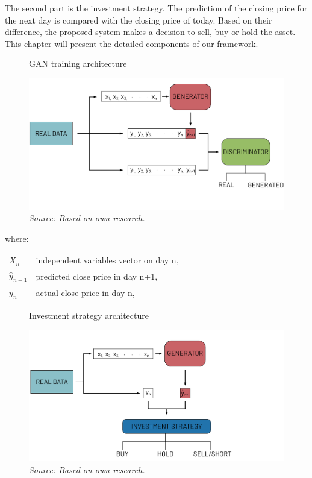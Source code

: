 \documentclass[11pt]{article} %
\makeatletter
\newenvironment{conditions}
  {\par\vspace{\abovedisplayskip}\noindent\begin{tabular}{>{$}l<{$} @{${}={}$} l}}
  {\end{tabular}\par\vspace{\belowdisplayskip}}
\makeatother
\begin{document}
The second part is the investment strategy. The prediction of the closing price for the next day is compared with the closing price of today. Based on their difference, the proposed system makes a decision to sell, buy or hold the asset. This chapter will present the detailed components of our framework. 

\begin{figure}[H]
\caption{GAN training architecture}
\includegraphics{rysunek1.png}
\caption*{\textit{Source: Based on own research.}}
\end{figure}

where:
\begin{conditions}
X_n & independent variables vector on day n, \\ 
 \hat{y}_{n+1}     &   predicted close price in day n+1,\\
 y_{n}     &  actual close price  in day n,\\   
\end{conditions}

\begin{figure}[H]
\caption{Investment strategy architecture}
\includegraphics{rysunek2.png}
\caption*{\textit{Source: Based on own research.}}
\end{figure}
\end{document}

